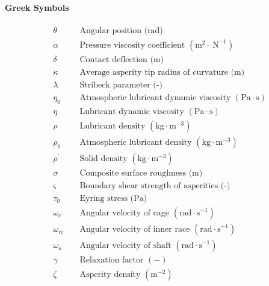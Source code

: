 \paragraph{Greek Symbols}
\begin{align*}
	&\theta && \text { Angular position (rad) } \\
	&\alpha && \text { Pressure viscosity coefficient }\left(\mathrm{m}^2 \cdot \mathrm{~N}^{-1}\right) \\
	&\delta && \text { Contact deflection (m) } \\
	&\kappa && \text { Average asperity tip radius of curvature (m) } \\
	&\lambda && \text { Stribeck parameter (-) } \\
	&\eta_0 && \text { Atmospheric lubricant dynamic viscosity }\left(\mathrm{Pa} \cdot \mathrm{s}\right) \\
	&\eta && \text { Lubricant dynamic viscosity }\left(\mathrm{Pa} \cdot \mathrm{s}\right) \\
	&\rho && \text { Lubricant density }\left(\mathrm{kg} \cdot \mathrm{m}^{-3} \right) \\
	&\rho_0 && \text { Atmospheric lubricant density }\left(\mathrm{kg} \cdot \mathrm{m}^{-3} \right) \\
	&\rho^{\prime} && \text { Solid density }\left(\mathrm{kg} \cdot \mathrm{m}^{-3} \right) \\
	&\sigma && \text { Composite surface roughness (m) } \\
	&\varsigma && \text { Boundary shear strength of asperities (-) } \\
	&\tau_0 && \text { Eyring stress (Pa) } \\
	&\omega_c && \text { Angular velocity of cage }\left(\mathrm{rad \cdot s}^{-1}\right) \\
	&\omega_{r i} && \text { Angular velocity of inner race }\left(\mathrm{rad \cdot s}^{-1}\right) \\
	&\omega_s && \text { Angular velocity of shaft }\left(\mathrm{rad \cdot s}^{-1}\right) \\
	&\gamma && \text { Relaxation factor }(-) \\
	&\zeta && \text { Asperity density }\left(\mathrm{m}^{-2}\right) \\
\end{align*}

